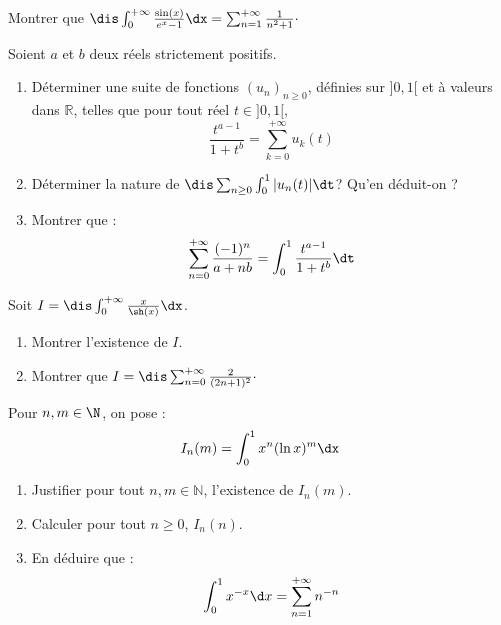 \documentclass[a4paper,10pt]{report}
\begin{document}
\medskip

\begin{Exa} Montrer que $\dis \int_{0}^{+ \infty} \frac{\sin(x)}{e^x-1} \dx = \sum_{n=1}^{+ \infty} \frac{1}{n^2+1}\cdot$
\end{Exa}



\begin{Exa} Soient $a$ et $b$ deux réels strictement positifs.
\begin{enumerate}
\item Déterminer une suite de fonctions $(u_n)_{n \geq 0}$, définies sur $]0,1[$ et à valeurs dans $\mathbb{R}$, telles que pour tout réel $t \in ]0,1[$,
$$ \dfrac{t^{a-1}}{1+t^b} = \sum_{k=0}^{+ \infty} u_k(t)$$
\item Déterminer la nature de $\dis \sum_{n \geq 0} \int_0^1 \vert u_n(t) \vert \dt$? Qu'en déduit-on ?
\item Montrer que :
$$ \sum_{n=0}^{+ \infty} \dfrac{(-1)^n}{a+nb} = \int_0^1 \dfrac{t^{a-1}}{1+t^b} \dt$$
\end{enumerate}
\end{Exa}


 


\begin{Exa}\label{gamma} Soit $I = \dis \int_{0}^{+ \infty} \frac{x}{\sh(x)} \dx$.

\begin{enumerate}
\item Montrer l'existence de $I$.
\item Montrer que $I= \dis \sum_{n=0}^{+ \infty} \frac{2}{(2n+1)^2}\cdot$
\end{enumerate}
\end{Exa} 



 
\begin{Exa} Pour $n,m \in \N$, on pose :
  \[
  I_{n}(m) = \int_{0}^{1} x^{n}(\ln x)^{m} \dx
  \]
  \begin{enumerate}
  \item Justifier pour tout $n,m \in \mathbb{N}$, l'existence de $I_n(m)$.
  \item Calculer pour tout $n \geq 0$, $I_{n}(n)$.
  \item
    En déduire que :
    \[
    \int_{0}^{1} x^{ - x} \d x = \sum_{n = 1}^{ + \infty} n^{ - n}
    \]
  \end{enumerate}
\end{Exa}
\end{document}
